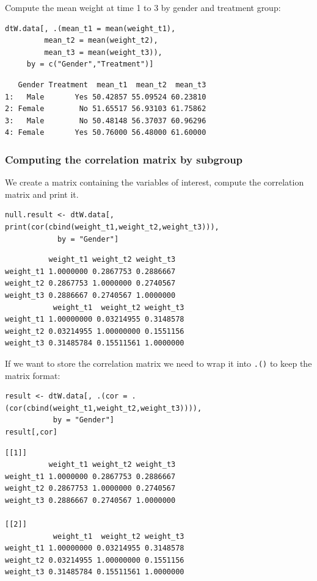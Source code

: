 \documentclass{article}
\begin{document}
Compute the mean weight at time 1 to 3 by gender and treatment group:
\lstset{language=r,label= ,caption= ,captionpos=b,numbers=none}
\begin{lstlisting}
dtW.data[, .(mean_t1 = mean(weight_t1),
	     mean_t2 = mean(weight_t2),
	     mean_t3 = mean(weight_t3)), 
	 by = c("Gender","Treatment")]
\end{lstlisting}

\begin{verbatim}
   Gender Treatment  mean_t1  mean_t2  mean_t3
1:   Male       Yes 50.42857 55.09524 60.23810
2: Female        No 51.65517 56.93103 61.75862
3:   Male        No 50.48148 56.37037 60.96296
4: Female       Yes 50.76000 56.48000 61.60000
\end{verbatim}

\subsubsection{Computing the correlation matrix by subgroup}
\label{sec:org2db7e59}

We create a matrix containing the variables of interest, compute the
correlation matrix and print it.
\lstset{language=r,label= ,caption= ,captionpos=b,numbers=none}
\begin{lstlisting}
null.result <- dtW.data[, print(cor(cbind(weight_t1,weight_t2,weight_t3))), 
			by = "Gender"]
\end{lstlisting}

\begin{verbatim}
          weight_t1 weight_t2 weight_t3
weight_t1 1.0000000 0.2867753 0.2886667
weight_t2 0.2867753 1.0000000 0.2740567
weight_t3 0.2886667 0.2740567 1.0000000
           weight_t1  weight_t2 weight_t3
weight_t1 1.00000000 0.03214955 0.3148578
weight_t2 0.03214955 1.00000000 0.1551156
weight_t3 0.31485784 0.15511561 1.0000000
\end{verbatim}

If we want to store the correlation matrix we need to wrap it into
\texttt{.()} to keep the matrix format:
\lstset{language=r,label= ,caption= ,captionpos=b,numbers=none}
\begin{lstlisting}
result <- dtW.data[, .(cor = .(cor(cbind(weight_t1,weight_t2,weight_t3)))), 
		   by = "Gender"]
result[,cor]
\end{lstlisting}

\begin{verbatim}
[[1]]
          weight_t1 weight_t2 weight_t3
weight_t1 1.0000000 0.2867753 0.2886667
weight_t2 0.2867753 1.0000000 0.2740567
weight_t3 0.2886667 0.2740567 1.0000000

[[2]]
           weight_t1  weight_t2 weight_t3
weight_t1 1.00000000 0.03214955 0.3148578
weight_t2 0.03214955 1.00000000 0.1551156
weight_t3 0.31485784 0.15511561 1.0000000
\end{verbatim}
\end{document}
